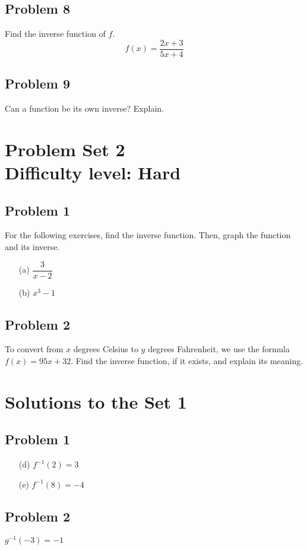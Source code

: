 \documentclass[12pt]{article}
\begin{document}
\subsection*{Problem 8}
Find the inverse function of \(f\).
\[f(x)=\dfrac{2x+3}{5x+4}\]

\subsection*{Problem 9}
Can a function be its own inverse? Explain.

\section*{Problem Set 2\\Difficulty level: Hard}
\subsection*{Problem 1}
For the following exercises, find the inverse function. Then, graph the function and its inverse.
\begin{enumerate}
    \item[(a)] \(\dfrac{3}{x-2}\)
    \item[(b)] \(x^3-1\)
\end{enumerate}

\subsection*{Problem 2}
To convert from \(x\) degrees Celsius to \(y\) degrees Fahrenheit, we use the formula \(f(x)=95x+32\). Find the inverse function, if it exists, and explain its meaning.

\newpage
\section*{Solutions to the Set 1}
\subsection*{Problem 1}
\begin{enumerate}
    \item[(d)] \( f^{-1}(2) = 3 \)
    \item[(e)] \( f^{-1}(8) = -4 \)
\end{enumerate}
\subsection*{Problem 2}
\(g^{-1}(-3)=-1\)
\end{document}
